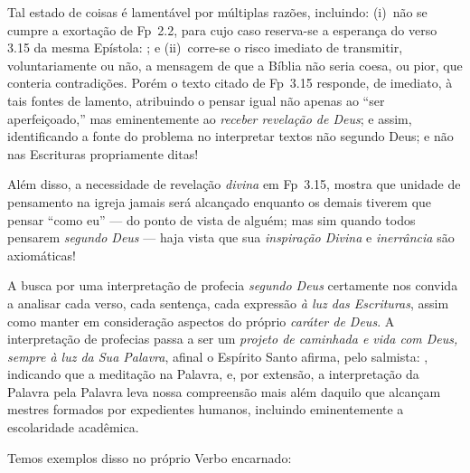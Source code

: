     Tal estado de coisas é lamentável por múltiplas razões, incluindo: (i)~não se cumpre a exortação de Fp~2.2, para  cujo  caso
    reserva-se a esperança do verso 3.15 da mesma Epístola: ; e  (ii)~corre-se
    o risco imediato de transmitir, voluntariamente ou não, a mensagem de que a Bíblia não seria coesa, ou  pior,  que  conteria
    contradições. Porém o texto citado de Fp~3.15 responde, de imediato, à tais fontes de lamento, atribuindo o pensar igual não
    apenas ao ``ser aperfeiçoado,'' mas eminentemente ao \emph{receber revelação de Deus}; e assim,  identificando  a  fonte  do
    problema no interpretar textos não segundo Deus; e não nas Escrituras propriamente ditas!

    Além disso, a necessidade de revelação \emph{divina} em Fp~3.15, mostra que unidade de  pensamento  na  igreja  jamais  será
    alcançado enquanto os demais tiverem que pensar ``como eu'' --- do ponto de vista de alguém; mas sim quando  todos  pensarem
    \emph{segundo Deus} --- haja vista que sua \emph{inspiração Divina} e \emph{inerrância} são axiomáticas!

    A busca por uma interpretação de profecia \emph{segundo Deus} certamente nos convida a analisar cada verso,  cada  sentença,
    cada expressão \emph{à luz das Escrituras}, assim como manter em consideração aspectos do próprio \emph{caráter de Deus}.  A
    interpretação de profecias passa a ser um \emph{projeto de caminhada e vida com Deus, sempre à luz da Sua Palavra}, afinal o
    Espírito Santo afirma, pelo salmista: , indicando que a meditação na Palavra, e,  por  extensão,  a  interpretação  da  Palavra  pela
    Palavra leva nossa compreensão  mais  além  daquilo  que  alcançam  mestres  formados  por  expedientes  humanos,  incluindo
    eminentemente a escolaridade acadêmica.

    Temos exemplos disso no próprio Verbo encarnado:


